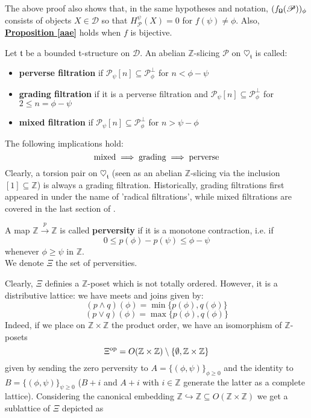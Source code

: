 The above proof also shows that, in the same hypotheses and notation, $(f_{\textnormal{\Libra}}(\mathscr{P}))_{\phi}$ consists of objects $X \in \mathscr{D}$ so that $H_{\mathscr{P}}^{\psi}(X)=0$ for $ f(\psi) \not = \phi$. Also, \hyperref[aae]{\textbf{Proposition \ref*{aae}}} holds when $f$ is bijective.\\

\begin{defn}
Let $\mathfrak{t}$ be a bounded t-structure on $\mathscr{D}$. An abelian $\mathbb{Z}$-slicing $\mathscr{P}$ on $\heartsuit_{\mathfrak{t}}$ is called:
\begin{itemize}
\item \textbf{perverse filtration} if $\mathscr{P}_{\psi}[n] \subseteq \mathscr{P}_{\phi}^{\perp}$ for $n < \phi - \psi$
\item \textbf{grading filtration} if it is a perverse filtration and $\mathscr{P}_{\psi}[n] \subseteq \mathscr{P}_{\phi }^{\perp}$ for $2 \le n = \phi - \psi$ 
\item \textbf{mixed filtration} if $\mathscr{P}_{\psi}[n] \subseteq \mathscr{P}_{\phi }^{\perp}$ for $n > \psi - \phi$ 
\end{itemize} 
\end{defn}

The following implications hold: 
$$\textnormal{mixed} \implies \textnormal{grading} \implies \textnormal{perverse} $$
Clearly, a torsion pair on $\heartsuit_{\mathfrak{t}}$ (seen as an abelian $\mathbb{Z}$-slicing via the inclusion $[1] \subseteq \mathbb{Z}$) is always a grading filtration. Historically, grading filtrations first appeared in \cite{ekh} under the name of 'radical filtrations', while mixed filtrations are covered in the last section of \cite{kos}.

\begin{defn}
A map $\mathbb{Z} \overset{p}{\longrightarrow} \mathbb{Z}$ is called \textbf{perversity} if it is a monotone contraction, i.e. if $$0 \le p(\phi) - p(\psi) \le \phi - \psi$$ 
whenever $\phi \ge \psi$  in $\mathbb{Z}$. \\
We denote $\Xi$ the set of perversities. 
\end{defn}

Clearly, $\Xi$ definies a $\mathbb{Z}$-poset which is not totally ordered. However, it is a distributive lattice: we have meets and joins given by: $$(p\land q)(\phi)=\min\{p(\phi), q(\phi) \}$$ $$(p\lor q)(\phi)=\max\{p(\phi), q(\phi) \}$$
Indeed, if we place on $\mathbb{Z}\times \mathbb{Z}$ the product order, we have an isomorphism of $\mathbb{Z}$-posets $$\Xi^{\textnormal{op}}=O(\mathbb{Z}\times \mathbb{Z})\setminus \{ \emptyset, \mathbb{Z} \times \mathbb{Z} \} $$
given by sending the zero perversity to $A=\{ (\phi,\psi) \}_{\phi \ge 0} $ and the identity to $B=\{ (\phi,\psi) \}_{\psi \ge 0}$ ($B+i$ and $A+i$ with $i \in \mathbb{Z}$ generate the latter as a complete lattice). Considering the canonical embedding $\mathbb{Z} \hookrightarrow \mathbb{Z}  \subseteq O(\mathbb{Z} \times \mathbb{Z})$ we get a sublattice of $\Xi$ depicted as 

